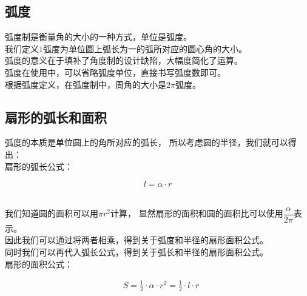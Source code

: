 \documentclass[UTF8]{ctexart}
\begin{document}
\subsection{弧度}
    弧度制是衡量角的大小的一种方式，单位是弧度。\\[3mm]
    我们定义$1$弧度为单位圆上弧长为一的弧所对应的圆心角的大小。\\[3mm]
    弧度的意义在于填补了角度制的设计缺陷，大幅度简化了运算。\\[3mm]
    弧度在使用中，可以省略弧度单位，直接书写弧度数即可。\\[3mm]
    根据弧度定义，在弧度制中，周角的大小是$2\pi$弧度。

\subsection{扇形的弧长和面积}
    弧度的本质是单位圆上的角所对应的弧长，
    所以考虑圆的半径，我们就可以得出：\\[3mm]
    扇形的弧长公式：
    \begin{large}
        \begin{equation*}
            l=\alpha \cdot r    
        \end{equation*}   
    \end{large}\\
    我们知道圆的面积可以用$\pi r^2$计算，
    显然扇形的面积和圆的面积比可以使用$\dfrac{\alpha}{2\pi}$表示。\\[3mm]
    因此我们可以通过将两者相乘，得到关于弧度和半径的扇形面积公式。\\[3mm]
    同时我们可以再代入弧长公式，得到关于弧长和半径的扇形面积公式。\\[3mm]
    扇形的面积公式：
    \begin{large}
        \begin{align*}
            &S=\frac{1}{2}\cdot \alpha \cdot r^2=\frac{1}{2}\cdot l \cdot r
        \end{align*}
    \end{large}

\newpage
\end{document}
